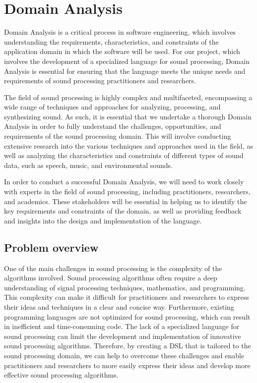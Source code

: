 \chapter{Domain Analysis}

Domain Analysis is a critical process in software engineering, which involves understanding the requirements, characteristics, and constraints of the application domain in which the software will be used. For our project, which involves the development of a specialized language for sound processing, Domain Analysis is essential for ensuring that the language meets the unique needs and requirements of sound processing practitioners and researchers.

The field of sound processing is highly complex and multifaceted, encompassing a wide range of techniques and approaches for analyzing, processing, and synthesizing sound. As such, it is essential that we undertake a thorough Domain Analysis in order to fully understand the challenges, opportunities, and requirements of the sound processing domain. This will involve conducting extensive research into the various techniques and approaches used in the field, as well as analyzing the characteristics and constraints of different types of sound data, such as speech, music, and environmental sounds.

In order to conduct a successful Domain Analysis, we will need to work closely with experts in the field of sound processing, including practitioners, researchers, and academics. These stakeholders will be essential in helping us to identify the key requirements and constraints of the domain, as well as providing feedback and insights into the design and implementation of the language.


\section{Problem overview} 
One of the main challenges in sound processing is the complexity of the algorithms involved. Sound processing algorithms often require a deep understanding of signal processing techniques, mathematics, and programming. This complexity can make it difficult for practitioners and researchers to express their ideas and techniques in a clear and concise way. Furthermore, existing programming languages are not optimized for sound processing, which can result in inefficient and time-consuming code. The lack of a specialized language for sound processing can limit the development and implementation of innovative sound processing algorithms. Therefore, by creating a DSL that is tailored to the sound processing domain, we can help to overcome these challenges and enable practitioners and researchers to more easily express their ideas and develop more effective sound processing algorithms.


